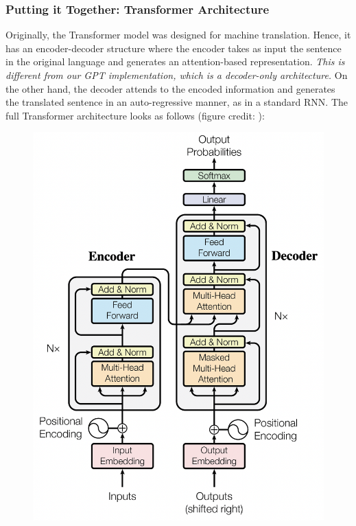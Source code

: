 \subsubsection{Putting it Together: Transformer Architecture}

Originally, the Transformer model was designed for machine translation.
Hence, it has an encoder-decoder structure where the encoder takes as input the sentence in the original language and generates an attention-based representation. \textit{This is different from our GPT implementation, which is a decoder-only architecture.}
On the other hand, the decoder attends to the encoded information and generates the translated sentence in an auto-regressive manner, as in a standard RNN. The full Transformer architecture looks as follows
(figure credit: \cite{vaswani2017attention}):

\begin{figure}[h]
    \centering
    \includegraphics[scale=0.5]{figures/transformer.png}
\end{figure}

